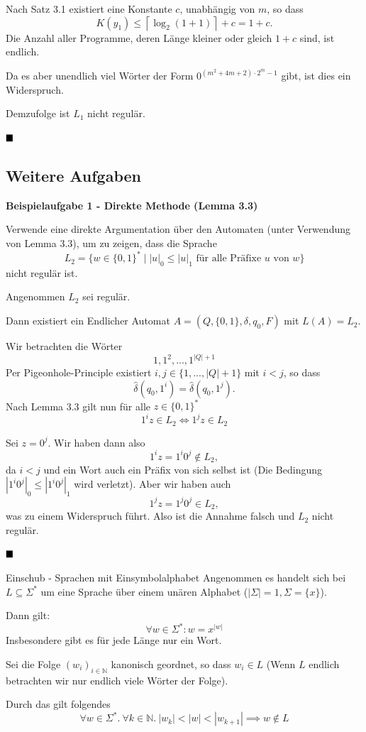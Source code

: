 \documentclass[a4paper, 11pt]{article}
\def\N{\mathbb{N}}
\newcommand\myTitle[1]{{\large \textbf {#1}}}
\begin{document}
    Nach Satz 3.1 existiert eine Konstante $c$, unabhängig von $m$, so dass 
    $$K(y_1) \leq \left\lceil\log_2(1+1)\right\rceil + c = 1+ c.$$
    Die Anzahl aller Programme, deren Länge kleiner oder gleich $1 + c$ sind, ist endlich. 
    
    Da es aber unendlich viel Wörter der Form $0^{(m^2 + 4m + 2) \cdot 2^m - 1}$ gibt, ist dies ein Widerspruch.

    Demzufolge ist $L_1$ nicht regulär.

    $\hfill\blacksquare$

\subsection{Weitere Aufgaben}

    \myTitle{Beispielaufgabe 1 - Direkte Methode (Lemma 3.3)}

    Verwende eine direkte Argumentation über den Automaten (unter Verwendung von Lemma 3.3), um zu zeigen, dass die Sprache
    $$L_2 = \{w \in \{0,1\}^* \mid |u|_0 \leq |u|_1 \text{ für alle Präfixe }u \text{ von }w\}$$
    nicht regulär ist.

    Angenommen $L_2$ sei regulär. 
    
    Dann existiert ein Endlicher Automat $A = (Q, \{0,1\}, \delta, q_0, F)$ mit $L(A) = L_2$. 
    
    Wir betrachten die Wörter
    $$1, 1^2, ..., 1^{|Q|+1}$$
    Per Pigeonhole-Principle existiert $i, j \in \{1, ..., |Q|+1\}$ mit $i < j$, so dass 
    $$\hat{\delta}(q_0, 1^i) = \hat{\delta}(q_0, 1^j).$$
    Nach Lemma 3.3 gilt nun für alle $z \in \{0,1\}^*$
    $$1^iz \in L_2 \iff 1^jz \in L_2$$

    Sei $z = 0^j$. Wir haben dann also 
    $$1^iz = 1^i0^j \notin L_2,$$
    da $i < j$ und ein Wort auch ein Präfix von sich selbst ist (Die Bedingung $|1^i0^j|_0 \leq |1^i0^j|_1$ wird verletzt).
    Aber wir haben auch
    $$1^jz = 1^j0^j \in L_2,$$
    was zu einem Widerspruch führt. Also ist die Annahme falsch und $L_2$ nicht regulär.

    $\hfill\blacksquare$

\begin{subbox}{Einschub - Sprachen mit Einsymbolalphabet}
    Angenommen es handelt sich bei $L \subseteq \Sigma^*$ um eine Sprache über einem unären Alphabet ($|\Sigma| = 1, \Sigma = \{x\}$).

    Dann gilt: $$\forall w \in \Sigma^*: w = x^{|w|}$$
    Insbesondere gibt es für jede Länge nur ein Wort. 
    
    Sei die Folge $(w_i)_{i \in \N}$ kanonisch geordnet, so dass $w_i \in L$ (Wenn $L$ endlich betrachten wir nur endlich viele Wörter der Folge).
    
    Durch das gilt folgendes
    $$\forall w \in \Sigma^*. \ \forall k \in \N. \ |w_k| < |w| < |w_{k+1}| \implies w \notin L$$
\end{subbox}
\end{document}
